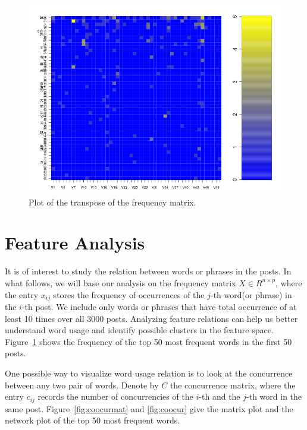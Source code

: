 \documentclass[11pt]{article}
\newcommand{\1}[1]{{\mathbf 1}\left\{#1\right\}}        %
\begin{document}
\begin{center}
\begin{figure}[tb]
   \centering
   \includegraphics[width=\textwidth]{../wordFreqMat.png} 
      \caption{Plot of the transpose of the frequency matrix.}
   \label{fig:freqmat}
\end{figure}
\end{center}


\section{Feature Analysis}\label{sec:feature}
It is of interest to study the relation between words or phrases in the posts. In what follows, we will base our analysis on the frequency matrix $X\in R^{n\times p}$, where the entry $x_{ij}$ stores the frequency of occurrences of the $j$-th word(or phrase) in the $i$-th post. We include only words or phrases that have total occurrence of at least 10 times over all 3000 posts. Analyzing feature relations can help us better understand word usage and identify possible clusters in the feature space.  Figure~\ref{fig:freqmat} shows the frequency of the top 50 most frequent words in the first 50 posts.


One possible way to visualize word usage relation is to look at the concurrence between any two pair of words. Denote by $C$ the concurrence matrix, where the entry $c_{ij}$ records the number of concurrencies of the $i$-th and the $j$-th word in the same post. Figure~\ref{fig:coocurmat} and \ref{fig:coocur} give the matrix plot and the network plot of the top 50 most frequent words. 
\end{document}
